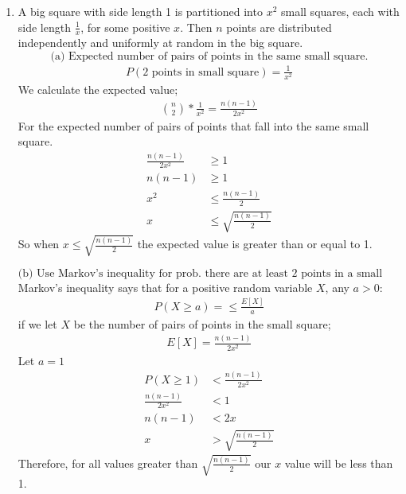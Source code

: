 \documentclass{article}
\begin{document}
\begin{enumerate}
\newpage
\item A big square with side length 1 is partitioned into $x^2$ small squares, each with side length $\frac{1}{x}$, for some positive $x$. Then $n$ points are distributed independently and uniformly at random in the big square. 
\[
\text{(a) Expected number of pairs of points in the same small square.}
\]
\begin{align*}
    P( \text{2 points in small square} ) = \frac{1}{x^{2}}
\end{align*}
We calculate the expected value;
\begin{align*}
    \binom{n}{2} * \frac{1}{x^2} = \frac{n(n-1)}{2x^2}
\end{align*}
For the expected number of pairs of points that fall into the same small square. 
\begin{align*}
    \frac{n(n-1)}{2x^2} & \geq 1 \\
    n(n-1) & \geq 1 \\
    x^{2} & \leq \frac{n(n-1)}{2} \\
    x & \leq \sqrt{\frac{n(n-1)}{2}}
\end{align*}
So when $x \leq \sqrt{\frac{n(n-1)}{2}}$ the expected value is greater than or equal to 1. 

\[
\text{(b) Use Markov's inequality for prob. there are at least 2 points in a small square}
\]
Markov's inequality says that for a positive random variable $X$, any $a > 0$: \\
\begin{align*}
    P(X \geq a) = \leq \frac{E[X]}{a}
\end{align*}
if we let $X$ be the number of pairs of points in the small square;
\begin{align*}
    E[X] = \frac{n(n-1)}{2x^2}
\end{align*}
Let $a = 1$
\begin{align*}
    P(X \geq 1) & < \frac{n(n-1)}{2x^2} \\
    \frac{n(n-1)}{2x^2} & < 1 \\
    n(n-1) & < 2x \\
    x & > \sqrt{\frac{n(n-1)}{2}}
\end{align*}
Therefore, for all values greater than $\sqrt{\frac{n(n-1)}{2}}$ our $x$ value will be less than 1. 


\end{enumerate}
\end{document}
